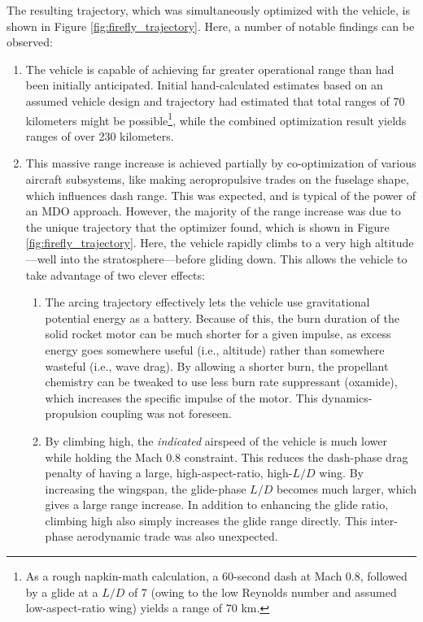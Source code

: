 The resulting trajectory, which was simultaneously optimized with the vehicle, is shown in Figure \ref{fig:firefly_trajectory}. Here, a number of notable findings can be observed:

\begin{enumerate}
    \item The vehicle is capable of achieving far greater operational range than had been initially anticipated. Initial hand-calculated estimates based on an assumed vehicle design and trajectory had estimated that total ranges of 70 kilometers might be possible\footnote{As a rough napkin-math calculation, a 60-second dash at Mach 0.8, followed by a glide at a $L/D$ of 7 (owing to the low Reynolds number and assumed low-aspect-ratio wing) yields a range of 70 km.}, while the combined optimization result yields ranges of over 230 kilometers.
    \item This massive range increase is achieved partially by co-optimization of various aircraft subsystems, like making aeropropulsive trades on the fuselage shape, which influences dash range. This was expected, and is typical of the power of an MDO approach. However, the majority of the range increase was due to the unique trajectory that the optimizer found, which is shown in Figure \ref{fig:firefly_trajectory}. Here, the vehicle rapidly climbs to a very high altitude—well into the stratosphere—before gliding down. This allows the vehicle to take advantage of two clever effects:
    \begin{enumerate}
        \item The arcing trajectory effectively lets the vehicle use gravitational potential energy as a battery. Because of this, the burn duration of the solid rocket motor can be much shorter for a given impulse, as excess energy goes somewhere useful (i.e., altitude) rather than somewhere wasteful (i.e., wave drag). By allowing a shorter burn, the propellant chemistry can be tweaked to use less burn rate suppressant (oxamide), which increases the specific impulse of the motor. This dynamics-propulsion coupling was not foreseen.
        \item By climbing high, the \emph{indicated} airspeed of the vehicle is much lower while holding the Mach 0.8 constraint. This reduces the dash-phase drag penalty of having a large, high-aspect-ratio, high-$L/D$ wing. By increasing the wingspan, the glide-phase $L/D$ becomes much larger, which gives a large range increase. In addition to enhancing the glide ratio, climbing high also simply increases the glide range directly. This inter-phase aerodynamic trade was also unexpected.
    \end{enumerate}
\end{enumerate}

